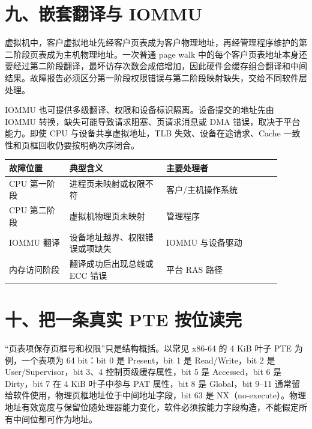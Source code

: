 \section{九、嵌套翻译与 IOMMU}

虚拟机中，客户虚拟地址先经客户页表成为客户物理地址，再经管理程序维护的第二阶段页表成为主机物理地址。一次普通 page walk 中的每个客户页表地址本身还要经过第二阶段翻译，最坏访存次数会成倍增加，因此硬件会缓存组合翻译和中间结果。故障报告必须区分第一阶段权限错误与第二阶段映射缺失，交给不同软件层处理。

IOMMU 也可提供多级翻译、权限和设备标识隔离。设备提交的地址先由 IOMMU 转换，缺失可能导致请求阻塞、页请求消息或 DMA 错误，取决于平台能力。即使 CPU 与设备共享虚拟地址，TLB 失效、设备在途请求、Cache 一致性和页框回收仍要按明确次序闭合。

\begin{longtable}{L{0.2\linewidth}L{0.32\linewidth}L{0.38\linewidth}}
\toprule
故障位置 & 典型含义 & 主要处理者 \\
\midrule
CPU 第一阶段 & 进程页未映射或权限不符 & 客户/主机操作系统 \\\tablerowrule
CPU 第二阶段 & 虚拟机物理页未映射 & 管理程序 \\\tablerowrule
IOMMU 翻译 & 设备地址越界、权限错误或项缺失 & IOMMU 与设备驱动 \\\tablerowrule
内存访问阶段 & 翻译成功后出现总线或 ECC 错误 & 平台 RAS 路径 \\
\bottomrule
\end{longtable}




























\section{十、把一条真实 PTE 按位读完}

“页表项保存页框号和权限”只是结构概括。以常见 x86-64 的 4 KiB 叶子 PTE 为例，一个表项为 64 bit：bit 0 是 Present，bit 1 是 Read/Write，bit 2 是 User/Supervisor，bit 3、4 控制页级缓存属性，bit 5 是 Accessed，bit 6 是 Dirty，bit 7 在 4 KiB 叶子中参与 PAT 属性，bit 8 是 Global，bit 9--11 通常留给软件使用，物理页框地址位于中间地址字段，bit 63 是 NX（no-execute）。物理地址有效宽度与保留位随处理器能力变化，软件必须按能力字段构造，不能假定所有中间位都可作为地址。

